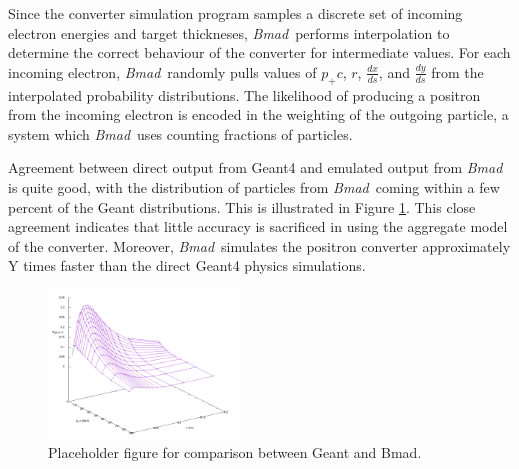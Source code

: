 \documentclass[letter,
               biblatex,     %
               keeplastbox,   %
               ]{jacow}
\newcommand{\bmad}{\textit{Bmad}}
\newcommand{\dxds}{\frac{dx}{ds}}
\newcommand{\dyds}{\frac{dy}{ds}}
\begin{document}
Since the converter simulation program samples a discrete set of incoming electron energies and target thickneses, \bmad \, performs interpolation to determine the correct behaviour of the converter for intermediate values.
For each incoming electron, \bmad \, randomly pulls values of $p_+ c$, $r$, $\dxds$, and $\dyds$ from the interpolated probability distributions.
The likelihood of producing a positron from the incoming electron is encoded in the weighting of the outgoing particle, a system which \bmad \, uses counting fractions of particles.

Agreement between direct output from Geant4 and emulated output from \bmad \, is quite good, with the distribution of particles from \bmad \, coming within a few percent of the Geant distributions.
This is illustrated in Figure \ref{fig:bmad}. %
This close agreement indicates that little accuracy is sacrificed in using the aggregate model of the converter.
Moreover, \bmad \, simulates the positron converter approximately Y times faster than the direct Geant4 physics simulations. %

\begin{figure}
\centering
\includegraphics[width=0.45\textwidth]{p1}
\caption{Placeholder figure for comparison between Geant and Bmad.}
\label{fig:bmad}
\end{figure}

%
%
%


%
%
%
%
%
%
\end{document}
